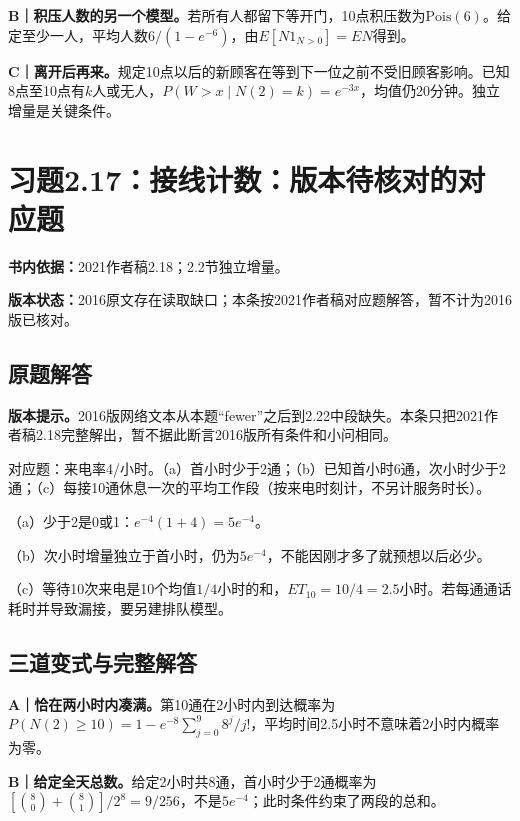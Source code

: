 \documentclass[
  11pt,
  a4paper,
  UTF8,fontset=fandol]{ctexart}
\let\OldSection\section
\renewcommand{\section}{\Needspace{7\baselineskip}\OldSection}
\let\OldSubsection\subsection
\renewcommand{\subsection}{\Needspace{5\baselineskip}\OldSubsection}
\begin{document}
\textbf{B｜积压人数的另一个模型。}若所有人都留下等开门，10点积压数为\(\mathrm{Pois}(6)\)。给定至少一人，平均人数\(6/(1-e^{-6})\)，由\(E[N1_{N>0}]=EN\)得到。

\textbf{C｜离开后再来。}规定10点以后的新顾客在等到下一位之前不受旧顾客影响。已知8点至10点有\(k\)人或无人，\(P(W>x\mid N(2)=k)=e^{-3x}\)，均值仍20分钟。独立增量是关键条件。

\newpage

\section{习题2.17：接线计数：版本待核对的对应题}\label{ux4e60ux98982.17ux63a5ux7ebfux8ba1ux6570ux7248ux672cux5f85ux6838ux5bf9ux7684ux5bf9ux5e94ux9898}

\textbf{书内依据：}2021作者稿2.18；2.2节独立增量。

\textbf{版本状态：}2016原文存在读取缺口；本条按2021作者稿对应题解答，暂不计为2016版已核对。

\subsection{原题解答}\label{ux539fux9898ux89e3ux7b54-16}

\textbf{版本提示。}2016版网络文本从本题``fewer''之后到2.22中段缺失。本条只把2021作者稿2.18完整解出，暂不据此断言2016版所有条件和小问相同。

对应题：来电率4/小时。（a）首小时少于2通；（b）已知首小时6通，次小时少于2通；（c）每接10通休息一次的平均工作段（按来电时刻计，不另计服务时长）。

（a）少于2是0或1：\(\boxed{e^{-4}(1+4)=5e^{-4}}\)。

（b）次小时增量独立于首小时，仍为\(\boxed{5e^{-4}}\)，不能因刚才多了就预想以后必少。

（c）等待10次来电是10个均值\(1/4\)小时的和，\(\boxed{ET_{10}=10/4=2.5\text{小时}}\)。若每通通话耗时并导致漏接，要另建排队模型。

\subsection{三道变式与完整解答}\label{ux4e09ux9053ux53d8ux5f0fux4e0eux5b8cux6574ux89e3ux7b54-16}

\textbf{A｜恰在两小时内凑满。}第10通在2小时内到达概率为\(P(N(2)\ge10)=1-e^{-8}\sum_{j=0}^9 8^j/j!\)，平均时间2.5小时不意味着2小时内概率为零。

\textbf{B｜给定全天总数。}给定2小时共8通，首小时少于2通概率为\([\binom80+\binom81]/2^8=9/256\)，不是\(5e^{-4}\)；此时条件约束了两段的总和。
\end{document}
